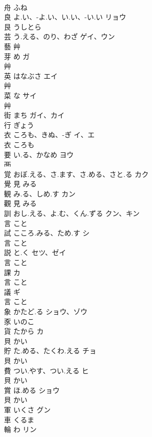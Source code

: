 \documentclass[8pt]{extreport}
\begin{document}
\begin{CJK}{UTF8}{min}
\\	舟		ふね		
\\	良	よ.い、-よ.い、い.い、-い.い	リョウ	
\\	艮		うしとら		
\\	芸	う.える、のり、わざ	ゲイ、ウン	
\\	藝	艸				
\\	芽	め	ガ	
\\	艸				
\\	英	はなぶさ	エイ	
\\	艸				
\\	菜	な	サイ	
\\	艸				
\\	街	まち	ガイ、カイ	
\\	行		ぎょう		
\\	衣	ころも、きぬ、-ぎ	イ、エ	
\\	衣		ころも		
\\	要	い.る、かなめ	ヨウ	
\\	襾				
\\	覚	おぼ.える、さ.ます、さ.める、さと.る	カク	
\\	覺	見		みる		
\\	観	み.る、しめ.す	カン	
\\	觀	見		みる		
\\	訓	おし.える、よ.む、くん.ずる	クン、キン	
\\	言		こと		
\\	試	こころ.みる、ため.す	シ	
\\	言		こと		
\\	説	と.く	セツ、ゼイ	
\\	言		こと		
\\	課		カ	
\\	言		こと		
\\	議		ギ	
\\	言		こと		
\\	象	かたど.る	ショウ、ゾウ	
\\	豕		いのこ		
\\	貨	たから	カ	
\\	貝		かい		
\\	貯	た.める、たくわ.える	チョ	
\\	貝		かい		
\\	費	つい.やす、つい.える	ヒ	
\\	貝		かい		
\\	賞	ほ.める	ショウ	
\\	貝		かい		
\\	軍	いくさ	グン	
\\	車		くるま		
\\	輪	わ	リン	

\end{CJK}
\end{document}
